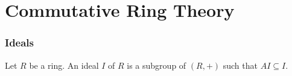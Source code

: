 \part{Commutative Ring Theory}
\section{Ideals}
\begin{definition}
	Let $R$ be a ring. An ideal $I$ of $R$ is a subgroup of $(R,+)$ such that $AI\subseteq I$.
\end{definition}
